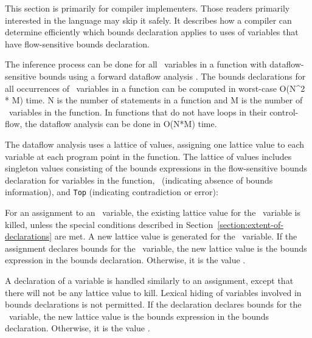 This section is primarily for compiler implementers. Those readers
primarily interested in the language may skip it safely. It describes
how a compiler can determine efficiently which bounds declaration
applies to uses of variables that have flow-sensitive bounds
declaration.

The inference process can be done for all \arrayptr\ variables
in a function with dataflow-sensitive bounds using a forward dataflow
analysis \cite{Aho2007}. The bounds declarations for all occurrences of
\arrayptr\ variables in a function can be computed in
worst-case O(N\^{}2 * M) time. N is the number of statements in a
function and M is the number of \arrayptr\ variables in the
function. In functions that do not have loops in their control-flow, the
dataflow analysis can be done in O(N*M) time.

The dataflow analysis uses a lattice of values, assigning one lattice
value to each variable at each program point in the function. The
lattice of values includes singleton values consisting of the bounds
expressions in the flow-sensitive bounds declaration for variables in
the function, \boundsnone\ (indicating absence of bounds
information), and \texttt{Top} (indicating contradiction or error):

 
For an assignment to an \arrayptr\ variable, the existing
lattice value for the \arrayptr\ variable is killed, unless
the special conditions described in Section~\ref{section:extent-of-declarations}
are met. 
A new lattice value is generated for the \arrayptr\ variable. If the
assignment declares bounds for the \arrayptr\ variable, the new
lattice value is the bounds expression in the bounds declaration.
Otherwise, it is the value \boundsnone.

A declaration of a variable is handled similarly to an assignment,
except that there will not be any lattice value to kill. Lexical hiding
of variables involved in bounds declarations is not permitted. If the
declaration declares bounds for the \arrayptr\ variable, the
new lattice value is the bounds expression in the bounds declaration.
Otherwise, it is the value \boundsnone.

